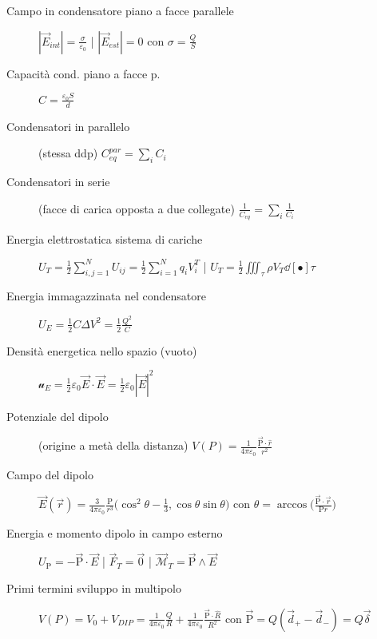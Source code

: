 \documentclass[10pt, oneside]{article}
\begin{document}
\begin{description}
\item[Campo in condensatore piano a facce parallele] \hfill $\displaystyle |\vec{E}_{int}| = \frac{\sigma}{\varepsilon_0}$ \quad | \quad $\displaystyle |\vec{E}_{est}| = 0$ con $\sigma = \frac{Q}{S}$

\item[Capacità cond. piano a facce p.] \hfill $\displaystyle C = \frac{\varepsilon_0 S}{d}$

\item[Condensatori in parallelo] (stessa ddp) \hfill $\displaystyle C_{eq}^{par} = \sum_i C_i$

\item[Condensatori in serie] (facce di carica opposta a due collegate) \hfill $\displaystyle \frac{1}{C_{eq}} = \sum_i \frac{1}{C_i}$

\item[Energia elettrostatica sistema di cariche] \hfill $\displaystyle U_T = \frac{1}{2} \sum\limits_{i,j=1}^{N} U_{ij} = \frac{1}{2} \sum\limits_{i=1}^{N} q_i V_{i}^{T}$ \quad | \quad $\displaystyle U_T = \frac{1}{2} \iiint_\tau \rho V_T \dd[•]{\tau}$

\item[Energia immagazzinata nel condensatore] \hfill $\displaystyle U_{E} = \frac{1}{2} C \Delta V^2 = \frac{1}{2} \frac{Q^2}{C}$

\item[Densità energetica nello spazio (vuoto)] \hfill $\displaystyle \mathcal{u}_E = \frac{1}{2} \varepsilon_0 \vec{E} \cdot \vec{E} = \frac{1}{2} \varepsilon_0 |\vec{E}|^2$

\item[Potenziale del dipolo] (origine a metà della distanza) \hfill $\displaystyle V(P) = \frac{1}{4 \pi \varepsilon_0} \frac{\vec{\mathrm{P}} \cdot \hat{r}}{r^2}$

\item[Campo del dipolo] \hfill $\displaystyle \vec{E}(\vec{r}) = \frac{3}{4 \pi \varepsilon_0} \frac{\mathrm{P}}{r^3} \big(\cos^2 \theta - \frac{1}{3}, \cos \theta \sin \theta \big)$ \qquad con $\displaystyle \theta = \arccos\big(\frac{\vec{\mathrm{P}} \cdot \vec{r}}{\mathrm{P} r}\big)$

\item[Energia e momento dipolo in campo esterno] \hfill $\displaystyle U_{\mathrm{P}} = - \vec{\mathrm{P}} \cdot \vec{E}$ \quad | \quad $\displaystyle \vec{F}_T = \vec{0}$ \quad | \quad $\displaystyle \vec{\mathcal{M}}_T = \vec{\mathrm{P}} \wedge \vec{E}$

\item[Primi termini sviluppo in multipolo] \hfill $\displaystyle V(P) = V_0 + V_{DIP} = \frac{1}{4 \pi \varepsilon_0} \frac{Q}{R} + \frac{1}{4 \pi \varepsilon_0} \frac{\vec{\mathrm{P}} \cdot \hat{R}}{R^2}$ \qquad con $\vec{\mathrm{P}} = Q ( \vec{d}_{+} - \vec{d}_{-}) = Q \vec{\delta}$

\end{description}
\end{document}
